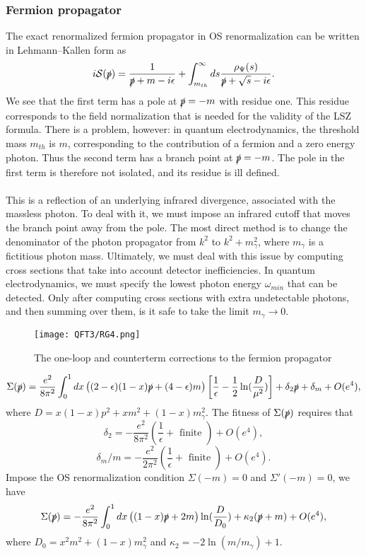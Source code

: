 \subsubsection{Fermion propagator}
The exact renormalized fermion propagator in OS renormalization can be written in Lehmann–Kallen form as
\[i\mathcal{S}(\slashed{p}) = \frac{1}{\slashed{p}+m-i\epsilon} + \int_{m_{th}}^{\infty} ds \frac{\rho_{\Psi}(s)}{\slashed{p}+\sqrt{s}-i\epsilon}.\]
We see that the first term has a pole at $\slashed{p}=-m$ with residue one. This residue corresponds to the field normalization that is needed for the validity of the LSZ formula.
There is a problem, however: in quantum electrodynamics, the threshold mass $m_{th}$ is $m$, corresponding to the contribution of a fermion and a zero energy photon. Thus the second term has a branch point at $\slashed{p}=-m$. The pole in the first term is therefore not isolated, and its residue is ill defined.
\\ \\
This is a reflection of an underlying infrared divergence, associated with the massless photon. To deal with it, we must impose an infrared cutoff that moves the branch point away from the pole. The most direct method is to change the denominator of the photon propagator from $k^2$ to $k^2+m_{\gamma}^2$, where $m_{\gamma}$ is a fictitious photon mass. Ultimately, we must deal with this issue by computing cross sections that take into account detector inefficiencies. 
In quantum electrodynamics, we must specify the lowest photon energy $\omega_{min}$ that can be detected. Only after computing cross sections with extra undetectable photons, and then summing over them, is it safe to take the limit $m_{\gamma} \to 0$. 
\begin{figure}[!h]
\centering
\texttt{[image: QFT3/RG4.png]}
\caption{The one-loop and counterterm corrections to the fermion propagator}
\end{figure}
\[\Sigma(\slashed{p}) = \frac{e^2}{8\pi^2} \int_0^1 dx \left( (2-\epsilon)(1-x)\slashed{p} + (4-\epsilon)m \right) \left[ \frac{1}{\epsilon} - \frac{1}{2}\ln(\frac{D}{\mu^2})\right] + \delta_2 \slashed{p} + \delta_m + O(e^4) ,\]
where $D = x(1-x)p^2 + xm^2 + (1-x)m_{\gamma}^2$.
The fitness of $\Sigma(\slashed{p})$ requires that
\[\delta_2 =  - \frac{e^2}{8\pi^2} \left( \frac{1}{\epsilon} + \mbox{ finite } \right) + O(e^4),\]
\[\delta_m/m = - \frac{e^2}{2\pi^2} \left( \frac{1}{\epsilon} + \mbox{ finite } \right) + O(e^4) .\]
Impose the OS renormalization condition $\Sigma(-m) = 0$ and $\Sigma'(-m) = 0$, we have
\[\Sigma(\slashed{p}) = -\frac{e^2}{8\pi^2} \int_0^1 dx \left( (1-x)\slashed{p} + 2m \right) \ln(\frac{D}{D_0})  + \kappa_2( \slashed{p} + m) + O(e^4) ,\]
where $D_0 = x^2m^2 +(1-x)m_{\gamma}^2$ and $\kappa_2 = -2 \ln(m/m_{\gamma})+1$. 

